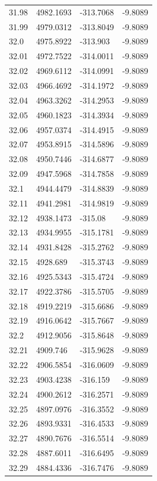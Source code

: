 \begin{table}[H]
\begin{tabular}{llll}
31.98 & 4982.1693 & -313.7068 & -9.8089 \\
31.99 & 4979.0312 & -313.8049 & -9.8089 \\
32.0 & 4975.8922 & -313.903 & -9.8089 \\
32.01 & 4972.7522 & -314.0011 & -9.8089 \\
32.02 & 4969.6112 & -314.0991 & -9.8089 \\
32.03 & 4966.4692 & -314.1972 & -9.8089 \\
32.04 & 4963.3262 & -314.2953 & -9.8089 \\
32.05 & 4960.1823 & -314.3934 & -9.8089 \\
32.06 & 4957.0374 & -314.4915 & -9.8089 \\
32.07 & 4953.8915 & -314.5896 & -9.8089 \\
32.08 & 4950.7446 & -314.6877 & -9.8089 \\
32.09 & 4947.5968 & -314.7858 & -9.8089 \\
32.1 & 4944.4479 & -314.8839 & -9.8089 \\
32.11 & 4941.2981 & -314.9819 & -9.8089 \\
32.12 & 4938.1473 & -315.08 & -9.8089 \\
32.13 & 4934.9955 & -315.1781 & -9.8089 \\
32.14 & 4931.8428 & -315.2762 & -9.8089 \\
32.15 & 4928.689 & -315.3743 & -9.8089 \\
32.16 & 4925.5343 & -315.4724 & -9.8089 \\
32.17 & 4922.3786 & -315.5705 & -9.8089 \\
32.18 & 4919.2219 & -315.6686 & -9.8089 \\
32.19 & 4916.0642 & -315.7667 & -9.8089 \\
32.2 & 4912.9056 & -315.8648 & -9.8089 \\
32.21 & 4909.746 & -315.9628 & -9.8089 \\
32.22 & 4906.5854 & -316.0609 & -9.8089 \\
32.23 & 4903.4238 & -316.159 & -9.8089 \\
32.24 & 4900.2612 & -316.2571 & -9.8089 \\
32.25 & 4897.0976 & -316.3552 & -9.8089 \\
32.26 & 4893.9331 & -316.4533 & -9.8089 \\
32.27 & 4890.7676 & -316.5514 & -9.8089 \\
32.28 & 4887.6011 & -316.6495 & -9.8089 \\
32.29 & 4884.4336 & -316.7476 & -9.8089 \\

\end{tabular}
\end{table}

